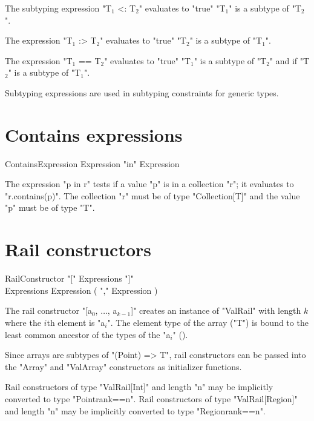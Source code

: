 The subtyping expression \xcdmath"T$_1$ <: T$_2$"
evaluates to  \xcd"true"  
                         \xcdmath"T$_1$"
                         is a subtype of
                         \xcdmath"T$_2$".

The expression \xcdmath"T$_1$ :> T$_2$"
evaluates to  \xcd"true"  
                         \xcdmath"T$_2$"
                         is a subtype of
                         \xcdmath"T$_1$".

The expression \xcdmath"T$_1$ == T$_2$"
evaluates to  \xcd"true"  
                         \xcdmath"T$_1$"
                         is a subtype of
                         \xcdmath"T$_2$"
                         and if
                         \xcdmath"T$_2$"
                         is a subtype of
                         \xcdmath"T$_1$".

                         Subtyping expressions are used in
                         subtyping constraints for generic
                         types.

\section{Contains expressions}

\begin{grammar}
ContainsExpression \: Expression \xcd"in" Expression \\
\end{grammar}

The expression \xcd"p in r" tests if a value \xcd"p" is in a collection
\xcd"r"; it evaluates to \xcd"r.contains(p)".
The collection \xcd"r"
must be of type \xcd"Collection[T]" and the value \xcd"p" must
be of type \xcd"T".

\section{Rail constructors}
\label{RailConstructors}

\begin{grammar}
RailConstructor \: \xcd"[" Expressions \xcd"]" \\
Expressions \: Expression ( \xcd"," Expression )\star \\
\end{grammar}

The rail constructor \xcdmath"[a$_0$, $\dots$, a$_{k-1}$]"
creates an instance of \xcd"ValRail" with length $k$
where the $i$th element is
\xcdmath"a$_i$".  The element type of the array (\xcd"T") is
bound to the least common ancestor of the types of the
\xcdmath"a$_i$" ().

Since arrays are subtypes of \xcd"(Point) => T",
rail constructors can be passed into the \xcd"Array" and
\xcd"ValArray" constructors as initializer functions.

Rail constructors of type \xcd"ValRail[Int]" and length \xcd"n" 
may be implicitly converted to type \xcd"Point{rank==n}".
Rail constructors of type \xcd"ValRail[Region]" and length \xcd"n" 
may be implicitly converted to type \xcd"Region{rank==n}".

